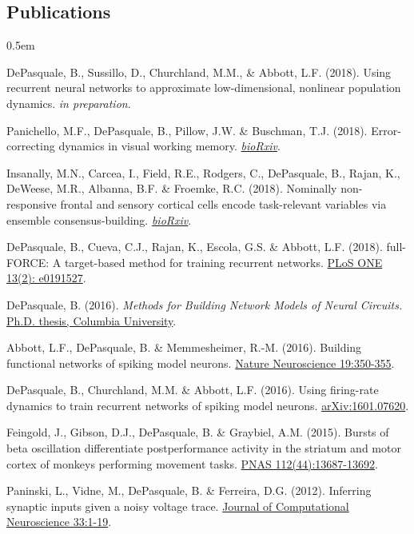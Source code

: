\documentclass[margin, 10pt]{res}
\begin{document}
\begin{resume}
\section{\textnormal\bf{Publications}} 

\begin{enumerate}[label={[\arabic*]}]
\itemsep0.5em 
\item DePasquale, B., Sussillo, D., Churchland, M.M., \& Abbott, L.F. (2018). Using recurrent neural networks to approximate low-dimensional, nonlinear population dynamics. \emph{in preparation}.
\item Panichello, M.F., DePasquale, B., Pillow, J.W. \& Buschman, T.J. (2018). Error-correcting dynamics in visual working memory. \href{https://www.biorxiv.org/content/biorxiv/early/2018/05/10/319103.full.pdf}{\emph{bioRxiv}}.
\item Insanally, M.N., Carcea, I., Field, R.E., Rodgers, C., DePasquale, B., Rajan, K., DeWeese, M.R., Albanna, B.F. \& Froemke, R.C. (2018). Nominally non-responsive frontal and sensory cortical cells encode task-relevant variables via ensemble consensus-building. \href{https://www.biorxiv.org/content/biorxiv/early/2018/06/14/347617.full.pdf}{\emph{bioRxiv}}.
\item DePasquale, B., Cueva, C.J., Rajan, K., Escola, G.S. \& Abbott, L.F. (2018). full-FORCE: A target-based method for training recurrent networks. \href{http://journals.plos.org/plosone/article?id=10.1371/journal.pone.0191527}{PLoS ONE 13(2): e0191527}.
\item DePasquale, B. (2016). \emph{Methods for Building Network Models of Neural Circuits.} \href{http://dx.doi.org/10.7916/D8W09600}{Ph.D. thesis, Columbia University}.
\item Abbott, L.F., DePasquale, B. \& Memmesheimer, R.-M. (2016). Building functional networks of spiking model neurons. \href{http://www.nature.com/neuro/journal/v19/n3/full/nn.4241.html}{Nature Neuroscience 19:350-355}.
\item DePasquale, B., Churchland, M.M. \& Abbott, L.F. (2016). Using firing-rate dynamics to train recurrent networks of spiking model neurons. \href{http://arxiv.org/abs/1601.07620} {arXiv:1601.07620}.
\item Feingold, J., Gibson, D.J., DePasquale, B. \& Graybiel, A.M. (2015). Bursts of beta oscillation differentiate postperformance activity in the striatum and motor cortex of monkeys performing movement tasks. \href{http://www.pnas.org/content/112/44/13687.long}{PNAS 112(44):13687-13692}.
\item Paninski, L., Vidne, M., DePasquale, B. \& Ferreira, D.G. (2012). Inferring synaptic inputs given a noisy voltage trace. \href{http://link.springer.com/article/10.1007\%2Fs10827-011-0371-7}{Journal of Computational Neuroscience 33:1-19}.
\end{enumerate}


\end{resume}
\end{document}
